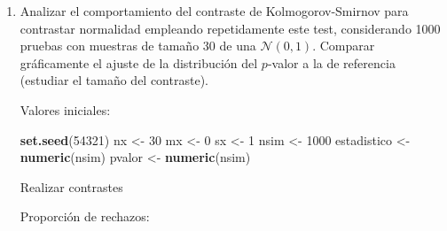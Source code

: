 \documentclass[]{book}
\newenvironment{Shaded}{\begin{snugshade}}{\end{snugshade}}
\newcommand{\KeywordTok}[1]{\textcolor[rgb]{0.13,0.29,0.53}{\textbf{#1}}}
\newcommand{\DecValTok}[1]{\textcolor[rgb]{0.00,0.00,0.81}{#1}}
\newcommand{\FloatTok}[1]{\textcolor[rgb]{0.00,0.00,0.81}{#1}}
\newcommand{\CharTok}[1]{\textcolor[rgb]{0.31,0.60,0.02}{#1}}
\newcommand{\StringTok}[1]{\textcolor[rgb]{0.31,0.60,0.02}{#1}}
\newcommand{\ControlFlowTok}[1]{\textcolor[rgb]{0.13,0.29,0.53}{\textbf{#1}}}
\newcommand{\OperatorTok}[1]{\textcolor[rgb]{0.81,0.36,0.00}{\textbf{#1}}}
\newcommand{\NormalTok}[1]{#1}
\theoremstyle{definition}
\theoremstyle{definition}
\theoremstyle{definition}
\theoremstyle{remark}
\begin{document}
\begin{enumerate}
\def\labelenumi{\alph{enumi})}
\item
  Analizar el comportamiento del contraste de Kolmogorov-Smirnov para
  contrastar normalidad empleando repetidamente este test, considerando
  1000 pruebas con muestras de tamaño 30 de una \(\mathcal{N}(0,1)\).
  Comparar gráficamente el ajuste de la distribución del \(p\)-valor a
  la de referencia (estudiar el tamaño del contraste).

  Valores iniciales:

\begin{Shaded}
\begin{Highlighting}[]
\KeywordTok{set.seed}\NormalTok{(}\DecValTok{54321}\NormalTok{)}
\NormalTok{nx <-}\StringTok{ }\DecValTok{30}
\NormalTok{mx <-}\StringTok{ }\DecValTok{0}
\NormalTok{sx <-}\StringTok{ }\DecValTok{1}
\NormalTok{nsim <-}\StringTok{ }\DecValTok{1000}
\NormalTok{estadistico <-}\StringTok{ }\KeywordTok{numeric}\NormalTok{(nsim)}
\NormalTok{pvalor <-}\StringTok{ }\KeywordTok{numeric}\NormalTok{(nsim)}
\end{Highlighting}
\end{Shaded}

  Realizar contrastes

\begin{Shaded}
\end{Shaded}

  Proporción de rechazos:

\begin{Shaded}
\end{Shaded}


\end{enumerate}
\end{document}
